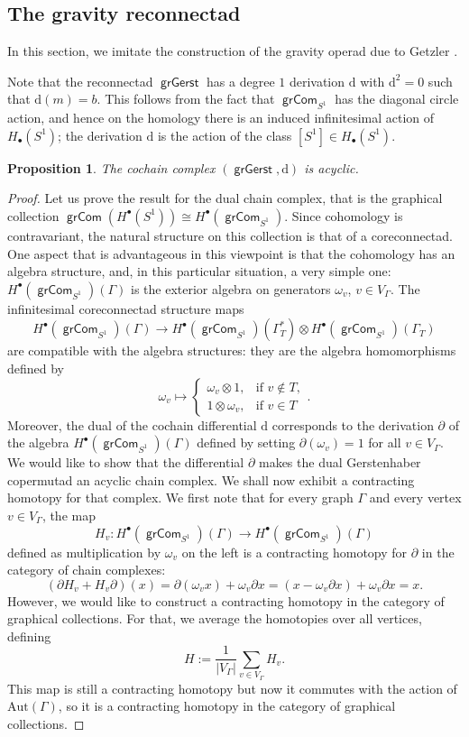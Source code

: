 \documentclass[11pt]{article}
\newtheorem{prop}[theo]{Proposition}
\theoremstyle{definition}
\numberwithin{equation}{section}
\DeclareMathOperator{\grCom}{\mathsf{grCom}}
\DeclareMathOperator{\grGerst}{\mathsf{grGerst}}
\begin{document}
\subsection{The gravity reconnectad}
In this section, we imitate the construction of the gravity operad due to Getzler \cite{MR1284793}. 

Note that the reconnectad $\grGerst$ has a degree $1$ derivation $\mathrm{d}$ with $\mathrm{d}^2=0$ such that $\mathrm{d}(m)=b$. This follows from the fact that $\grCom_{S^1}$ has the diagonal circle action, and hence on the homology there is an induced infinitesimal action of $H_\bullet(S^1)$; the derivation $\mathrm{d}$ is the action of the class $[S^1]\in H_\bullet(S^1)$. 

\begin{prop}\label{prop:acyclic}
The cochain complex $(\grGerst, \mathrm{d})$ is acyclic. 
\end{prop}

\begin{proof}
Let us prove the result for the dual chain complex, that is the graphical collection $\grCom(H^{\bullet}(S^1))\cong H^\bullet(\grCom_{S^1})$. 
Since cohomology is contravariant, the natural structure on this collection is that of a coreconnectad. One aspect that is advantageous in this viewpoint is that the cohomology has an algebra structure, and, in this particular situation, a very simple one: $H^\bullet(\grCom_{S^1})(\Gamma)$ is the exterior algebra on generators $\omega_v$, $v\in V_\Gamma$. The infinitesimal coreconnectad structure maps 
 \[
H^\bullet(\grCom_{S^1})(\Gamma)\to H^\bullet(\grCom_{S^1})(\Gamma^*_T)\otimes H^\bullet(\grCom_{S^1})(\Gamma_T)
 \] 
are compatible with the algebra structures: they are the algebra homomorphisms defined by 
\[
 \omega_v \mapsto \begin{cases}
    \omega_v\otimes1, & \text{if } v\not\in T,\\
    1\otimes\omega_v, & \text{if } v \in T
    \end{cases}.
\]
Moreover, the dual of the cochain differential $\mathrm{d}$ corresponds to the derivation $\partial$ of the algebra $H^\bullet(\grCom_{S^1})(\Gamma)$ defined by setting $\partial(\omega_v)=1$ for all $v\in V_\Gamma$. We would like to show that the differential $\partial$ makes the dual Gerstenhaber copermutad an acyclic chain complex. We shall now exhibit a contracting homotopy for that complex. We first note that for every graph $\Gamma$ and every vertex $v \in V_\Gamma$, the map 
 \[
H_v\colon H^\bullet(\grCom_{S^1})(\Gamma)\to H^\bullet(\grCom_{S^1})(\Gamma)
 \]
defined as multiplication by $\omega_v$ on the left is a contracting homotopy for $\partial$ in the category of chain complexes:
 \[
(\partial H_v +H_v \partial)(x)=\partial(\omega_vx)+\omega_v\partial x=(x-\omega_v\partial x)+\omega_v\partial x=x.
 \]
However, we would like to construct a contracting homotopy in the category of graphical collections. For that, we average the homotopies over all vertices, defining
 \[
H:=\frac{1}{|V_\Gamma|}\sum_{v \in V_\Gamma} H_v.
 \] 
This map is still a contracting homotopy but now it commutes with the action of $\mathrm{Aut}(\Gamma)$, so it is a contracting homotopy in the category of graphical collections.
\end{proof}
\end{document}
